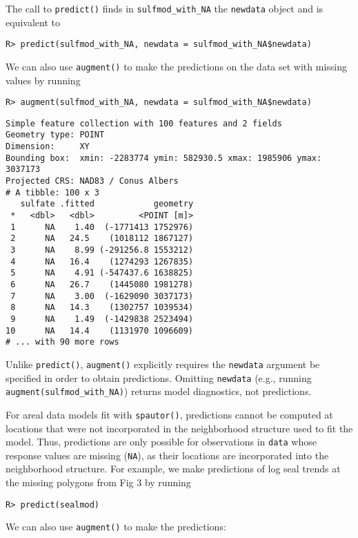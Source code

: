 \documentclass[10pt,letterpaper]{article}
\begin{document}
The call to \texttt{predict()} finds in \texttt{sulfmod\_with\_NA} the
\texttt{newdata} object and is equivalent to

\begin{verbatim}
R> predict(sulfmod_with_NA, newdata = sulfmod_with_NA$newdata)
\end{verbatim}

We can also use \texttt{augment()} to make the predictions on the data
set with missing values by running

\begin{verbatim}
R> augment(sulfmod_with_NA, newdata = sulfmod_with_NA$newdata)
\end{verbatim}

\begin{verbatim}
Simple feature collection with 100 features and 2 fields
Geometry type: POINT
Dimension:     XY
Bounding box:  xmin: -2283774 ymin: 582930.5 xmax: 1985906 ymax: 3037173
Projected CRS: NAD83 / Conus Albers
# A tibble: 100 x 3
   sulfate .fitted            geometry
 *   <dbl>   <dbl>         <POINT [m]>
 1      NA    1.40  (-1771413 1752976)
 2      NA   24.5    (1018112 1867127)
 3      NA    8.99 (-291256.8 1553212)
 4      NA   16.4    (1274293 1267835)
 5      NA    4.91 (-547437.6 1638825)
 6      NA   26.7    (1445080 1981278)
 7      NA    3.00  (-1629090 3037173)
 8      NA   14.3    (1302757 1039534)
 9      NA    1.49  (-1429838 2523494)
10      NA   14.4    (1131970 1096609)
# ... with 90 more rows
\end{verbatim}

Unlike \texttt{predict()}, \texttt{augment()} explicitly requires the
\texttt{newdata} argument be specified in order to obtain predictions.
Omitting \texttt{newdata} (e.g., running
\texttt{augment(sulfmod\_with\_NA)}) returns model diagnostics, not
predictions.

For areal data models fit with \texttt{spautor()}, predictions cannot be
computed at locations that were not incorporated in the neighborhood
structure used to fit the model. Thus, predictions are only possible for
observations in \texttt{data} whose response values are missing
(\texttt{NA}), as their locations are incorporated into the neighborhood
structure. For example, we make predictions of log seal trends at the
missing polygons from Fig 3 by running

\begin{verbatim}
R> predict(sealmod)
\end{verbatim}

We can also use \texttt{augment()} to make the predictions:
\end{document}
